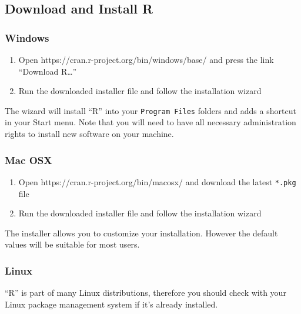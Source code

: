 \documentclass[
]{book}
\providecommand{\tightlist}{%
  \setlength{\itemsep}{0pt}\setlength{\parskip}{0pt}}
\begin{document}
\hypertarget{download-and-install-r}{%
\subsection{Download and Install R}\label{download-and-install-r}}

\hypertarget{windows}{%
\subsubsection{Windows}\label{windows}}

\begin{enumerate}
\def\labelenumi{\arabic{enumi}.}
\tightlist
\item
  Open https://cran.r-project.org/bin/windows/base/ and press the link ``Download R\ldots{}''
\item
  Run the downloaded installer file and follow the installation wizard
\end{enumerate}

The wizard will install ``R'' into your \texttt{Program\ Files} folders and adds a shortcut in your Start menu. Note that you will need to have all necessary administration rights to install new software on your machine.

\hypertarget{mac-osx}{%
\subsubsection{Mac OSX}\label{mac-osx}}

\begin{enumerate}
\def\labelenumi{\arabic{enumi}.}
\tightlist
\item
  Open https://cran.r-project.org/bin/macosx/ and download the latest \texttt{*.pkg} file
\item
  Run the downloaded installer file and follow the installation wizard
\end{enumerate}

The installer allows you to customize your installation. However the default values will be suitable for most users.

\hypertarget{linux}{%
\subsubsection{Linux}\label{linux}}

``R'' is part of many Linux distributions, therefore you should check with your Linux package management system if it's already installed.
\end{document}
